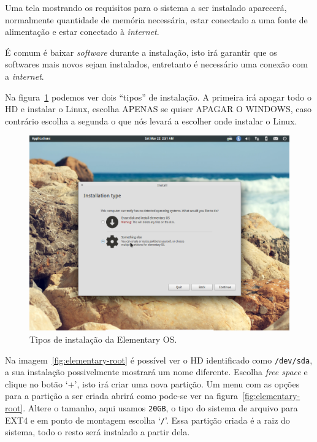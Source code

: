 \documentclass{handout_utfpr}
\begin{document}
Uma tela mostrando os requisitos para o sistema a ser instalado aparecerá, normalmente quantidade de memória necessária, estar conectado a uma fonte de alimentação e estar conectado à \textit{internet}.

É comum é baixar \textit{software} durante a instalação, isto irá garantir que os softwares mais novos sejam instalados, entretanto é necessário uma conexão com a \textit{internet}.

Na figura~\ref{fig:elementary-install} podemos ver dois ``tipos'' de instalação. A primeira irá apagar todo o HD e instalar o Linux, escolha APENAS se quiser APAGAR O WINDOWS, caso contrário escolha a segunda o que nós levará a escolher onde instalar o Linux.

\begin{figure}[H]
  \centering
  \includegraphics[scale=.3]{imagens/elementary-install-03.png}
  \caption{Tipos de instalação da Elementary OS\@.}
  \label{fig:elementary-install}
\end{figure}

Na imagem~\ref{fig:elementary-root} é possível ver o HD identificado como \texttt{/dev/sda}, a sua instalação possivelmente mostrará um nome diferente. Escolha \textit{free space} e clique no botão `+', isto irá criar uma nova partição. Um menu com as opções para a partição a ser criada abrirá como pode-se ver na figura~\ref{fig:elementary-root}. Altere o tamanho, aqui usamos \texttt{20GB}, o tipo do sistema de arquivo para EXT4 e em ponto de montagem escolha `\texttt{/}'. Essa partição criada é a raiz do sistema, todo o resto será instalado a partir dela.
\end{document}
